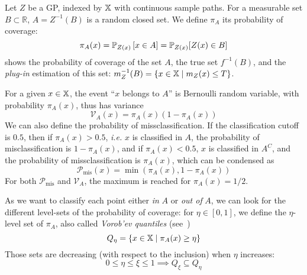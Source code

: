 \documentclass[../../Main_ManuscritThese.tex]{subfiles}
\begin{document}
Let $Z$ be a GP, indexed by $\mathbb{X}$ with continuous sample
paths. For a measurable set $B\subset \mathbb{R}$, $A = Z^{-1}(B)$ is
a random closed set.  We define $\pi_A$ its probability of coverage:
\begin{equation}
  \pi_A(x) = \mathbb{P}_{Z(x)}\left[x\in A\right] = \mathbb{P}_{Z(x)}[Z(x) \in B]
\end{equation}
 shows the probability of coverage of
the set $A$, the true set $f^{-1}(B)$, and the \emph{plug-in} estimation of
this set: $m_Z^{-1}(B) = \{x\in\mathbb{X} \mid m_Z(x) \leq T\}$.

For a given $x\in\mathbb{X}$, the event ``$x$ belongs to $A$'' is
Bernoulli random variable, with probability $\pi_A(x)$, thus has
variance %
\begin{equation}
  \label{eq:bernoulli_cov_variance}
\mathscr{V}_A(x)=\pi_A(x)(1 - \pi_A(x))
\end{equation}
We can also define the probability of missclassification. If the
classification cutoff is $0.5$, then if $\pi_A(x) > 0.5$, \emph{i.e.}
$x$ is classified in $A$, the probability of misclassification is
$1-\pi_A(x)$, and if $\pi_A(x) < 0.5$, $x$ is classified in $A^{C}$,
and the probability of missclassification is $\pi_A(x)$, which can be
condensed as
\begin{equation}
\mathscr{P}_{\mathrm{mis}}(x) = \min(\pi_A(x), 1-\pi_A(x))
\end{equation}
For both $\mathscr{P}_{\mathrm{mis}}$ and $\mathscr{V}_A$, the maximum is reached for $\pi_A(x) = 1/2$.

As we want to classify each point either \emph{in} $A$ or \emph{out
  of} $A$, we can look for the different level-sets of the probability
of coverage: for $\eta \in [0, 1]$, we define the $\eta$-level set of
$\pi_A$, also called \emph{Vorob'ev quantiles}
(see~\cite{vorobyev_new_2003})
\begin{equation}
  Q_{\eta} = \{x\in\mathbb{X} \mid \pi_A(x) \geq \eta \}
\end{equation}
Those sets are decreasing (with respect to the inclusion) when $\eta$ increases:
\begin{equation}
  0\leq \eta \leq \xi \leq 1 \implies Q_{\xi} \subseteq Q_{\eta}
\end{equation}
\end{document}
